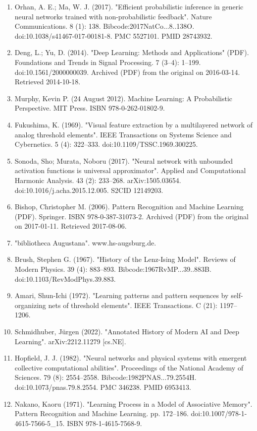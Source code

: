 \begin{enumerate}
\item Orhan, A. E.; Ma, W. J. (2017). "Efficient probabilistic inference in generic neural networks trained with non-probabilistic feedback". Nature Communications. 8 (1): 138. Bibcode:2017NatCo...8..138O. doi:10.1038/s41467-017-00181-8. PMC 5527101. PMID 28743932.
\item Deng, L.; Yu, D. (2014). "Deep Learning: Methods and Applications" (PDF). Foundations and Trends in Signal Processing. 7 (3–4): 1–199. doi:10.1561/2000000039. Archived (PDF) from the original on 2016-03-14. Retrieved 2014-10-18.
\item Murphy, Kevin P. (24 August 2012). Machine Learning: A Probabilistic Perspective. MIT Press. ISBN 978-0-262-01802-9.
\item Fukushima, K. (1969). "Visual feature extraction by a multilayered network of analog threshold elements". IEEE Transactions on Systems Science and Cybernetics. 5 (4): 322–333. doi:10.1109/TSSC.1969.300225.
\item Sonoda, Sho; Murata, Noboru (2017). "Neural network with unbounded activation functions is universal approximator". Applied and Computational Harmonic Analysis. 43 (2): 233–268. arXiv:1505.03654. doi:10.1016/j.acha.2015.12.005. S2CID 12149203.
\item Bishop, Christopher M. (2006). Pattern Recognition and Machine Learning (PDF). Springer. ISBN 978-0-387-31073-2. Archived (PDF) from the original on 2017-01-11. Retrieved 2017-08-06.
\item "bibliotheca Augustana". www.hs-augsburg.de.
\item Brush, Stephen G. (1967). "History of the Lenz-Ising Model". Reviews of Modern Physics. 39 (4): 883–893. Bibcode:1967RvMP...39..883B. doi:10.1103/RevModPhys.39.883.
\item Amari, Shun-Ichi (1972). "Learning patterns and pattern sequences by self-organizing nets of threshold elements". IEEE Transactions. C (21): 1197–1206.
\item Schmidhuber, Jürgen (2022). "Annotated History of Modern AI and Deep Learning". arXiv:2212.11279 [cs.NE].
\item Hopfield, J. J. (1982). "Neural networks and physical systems with emergent collective computational abilities". Proceedings of the National Academy of Sciences. 79 (8): 2554–2558. Bibcode:1982PNAS...79.2554H. doi:10.1073/pnas.79.8.2554. PMC 346238. PMID 6953413.
\item Nakano, Kaoru (1971). "Learning Process in a Model of Associative Memory". Pattern Recognition and Machine Learning. pp. 172–186. doi:10.1007/978-1-4615-7566-5_15. ISBN 978-1-4615-7568-9.

\end{enumerate}
